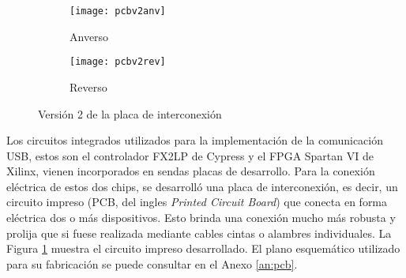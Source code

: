 \begin{figure}[t]
	\centering
	\begin{subfigure}[t]{0.45\textwidth}
		\centering
		\texttt{[image: pcbv2anv]}
		\caption*{Anverso}
	\end{subfigure}
	\begin{subfigure}[t]{0.45\textwidth}
		\centering
		\texttt{[image: pcbv2rev]}
		\caption*{Reverso}
	\end{subfigure}
	\caption{Versión 2 de la placa de interconexión}
	\label{fpga:pcb:v2}
\end{figure}

Los circuitos integrados utilizados para la implementación de la comunicación USB, estos son el controlador FX2LP de Cypress y el FPGA Spartan VI de Xilinx, vienen incorporados en sendas placas de desarrollo. Para la conexión eléctrica de estos dos chips, se desarrolló una placa de interconexión, es decir, un circuito impreso (PCB, del ingles {\it Printed Circuit Board}) que conecta en forma eléctrica dos o más dispositivos. Esto brinda una conexión mucho más robusta y prolija que si fuese realizada mediante cables cintas o alambres individuales. La Figura \ref{fpga:pcb:v2} muestra el circuito impreso desarrollado. El plano esquemático utilizado para su fabricación se puede consultar en el Anexo \ref{an:pcb}.

%
%

